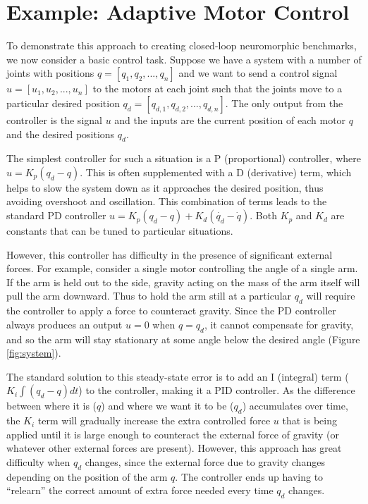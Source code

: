 \documentclass{frontiersSCNS} %
\begin{document}
\section{Example: Adaptive Motor Control}

To demonstrate this approach to creating closed-loop neuromorphic benchmarks,
we now consider a basic control task.  Suppose we have a system with a number
of joints with positions $q = [q_1, q_2, ..., q_n]$ and we want to send a control signal $u = [u_1, u_2, ..., u_n]$ to the motors at each joint
such that
the joints move to a particular desired position $q_d = [q_{d,1}, q_{d,2}, ..., q_{d,n}]$.  The only output from the controller is
the signal $u$ and the inputs are the current position
of each motor $q$ and the desired positions $q_d$.

The simplest controller for such a situation is a P (proportional) controller,
where $u=K_p(q_d - q)$.  This is often supplemented with a D (derivative) term,
which helps to slow the system down as it approaches the desired position,
thus avoiding overshoot and oscillation. This combination of terms leads to the
standard PD controller $u=K_p(q_d - q) + K_d(\dot{q_d} - \dot{q})$.
Both $K_p$ and $K_d$ are constants that can be
tuned to particular situations.

However, this controller has difficulty in the presence of significant external
forces.  For example, consider a single motor controlling the angle of a single
arm.  If the arm is held out to the side, gravity acting on the mass of the
arm itself will pull the arm downward.  Thus to hold the arm still at a
particular $q_d$ will require the controller to apply a force to counteract
gravity.  Since the PD controller always produces an output $u=0$ when $q=q_d$,
it cannot compensate for gravity, and so the arm will stay stationary at some
angle below the desired angle (Figure \ref{fig:system}).

The standard solution to this steady-state error is to add an I (integral) term ($K_i \int{(q_d-q) dt}$)
to the controller, making it a PID controller.  As the difference between where it is ($q$) and
where we want it to be ($q_d$) accumulates over time, the $K_i$ term will gradually increase
the extra controlled force $u$ that is being applied until it is large enough to counteract
the external force of gravity (or whatever other external forces are present).
However, this approach has great difficulty when $q_d$ changes, since the
external force due to gravity changes depending on the position of the arm $q$.
The controller ends up having to ``relearn'' the
correct amount of extra force needed every time $q_d$ changes.
\end{document}

